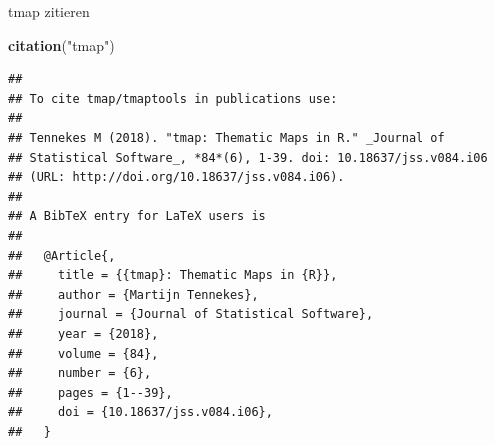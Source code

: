 \documentclass[ignorenonframetext,]{beamer}
\newenvironment{Shaded}{\begin{snugshade}}{\end{snugshade}}
\newcommand{\KeywordTok}[1]{\textcolor[rgb]{0.13,0.29,0.53}{\textbf{#1}}}
\newcommand{\StringTok}[1]{\textcolor[rgb]{0.31,0.60,0.02}{#1}}
\newcommand{\NormalTok}[1]{#1}
\begin{document}
\begin{frame}[fragile]{tmap zitieren}

\begin{Shaded}
\begin{Highlighting}[]
\KeywordTok{citation}\NormalTok{(}\StringTok{"tmap"}\NormalTok{)}
\end{Highlighting}
\end{Shaded}

\begin{verbatim}
## 
## To cite tmap/tmaptools in publications use:
## 
## Tennekes M (2018). "tmap: Thematic Maps in R." _Journal of
## Statistical Software_, *84*(6), 1-39. doi: 10.18637/jss.v084.i06
## (URL: http://doi.org/10.18637/jss.v084.i06).
## 
## A BibTeX entry for LaTeX users is
## 
##   @Article{,
##     title = {{tmap}: Thematic Maps in {R}},
##     author = {Martijn Tennekes},
##     journal = {Journal of Statistical Software},
##     year = {2018},
##     volume = {84},
##     number = {6},
##     pages = {1--39},
##     doi = {10.18637/jss.v084.i06},
##   }
\end{verbatim}

\end{frame}
\end{document}
